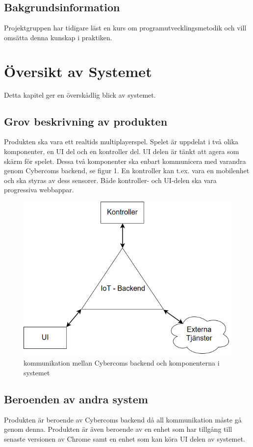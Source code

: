 \documentclass[10pt]{article}
\begin{document}
	\subsection{Bakgrundsinformation}
		Projektgruppen har tidigare läst en kurs om programutvecklingsmetodik och vill omsätta denna kunskap i praktiken. 
		
\pagebreak
\section{Översikt av Systemet}
	Detta kapitel ger en överskådlig blick av systemet.

	\subsection{Grov beskrivning av produkten}
	Produkten ska vara ett realtids multiplayerspel. Spelet är uppdelat i två olika komponenter, en UI del och en kontroller del. UI delen är tänkt att agera som skärm för spelet.  Dessa två komponenter ska enbart kommunicera med varandra genom Cybercoms backend, se figur 1. En kontroller kan t.ex. vara en mobilenhet och ska styras av dess sensorer. Både kontroller- och UI-delen ska vara progressiva webbappar. 
	
	\begin{figure}[h]
		\centering
		\includegraphics[scale=0.4]{backend}
		\caption{kommunikation mellan Cybercoms backend och komponenterna i systemet}
		\label{fig:backend}
	\end{figure}
	
	
	\subsection{Beroenden av andra system}
	Produkten är beroende av Cybercoms backend då all kommunikation måste gå genom denna. Produkten är även beroende av en enhet som har tillgång till senaste versionen av Chrome samt en enhet som kan köra UI delen av systemet.
\end{document}
